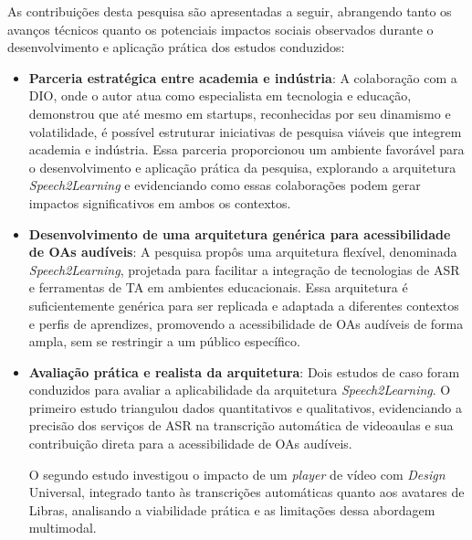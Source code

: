 
As contribuições desta pesquisa são apresentadas a seguir, abrangendo tanto os avanços técnicos quanto os potenciais impactos sociais observados durante o desenvolvimento e aplicação prática dos estudos conduzidos:

\begin{itemize} 

    \item \textbf{Parceria estratégica entre academia e indústria}: A colaboração com a DIO, onde o autor atua como especialista em tecnologia e educação, demonstrou que até mesmo em startups, reconhecidas por seu dinamismo e volatilidade, é possível estruturar iniciativas de pesquisa viáveis que integrem academia e indústria. Essa parceria proporcionou um ambiente favorável para o desenvolvimento e aplicação prática da pesquisa, explorando a arquitetura \textit{Speech2Learning} e evidenciando como essas colaborações podem gerar impactos significativos em ambos os contextos.

    \item \textbf{Desenvolvimento de uma arquitetura genérica para acessibilidade de OAs audíveis}: A pesquisa propôs uma arquitetura flexível, denominada \textit{Speech2Learning}, projetada para facilitar a integração de tecnologias de ASR e ferramentas de TA em ambientes educacionais. Essa arquitetura é suficientemente genérica para ser replicada e adaptada a diferentes contextos e perfis de aprendizes, promovendo a acessibilidade de OAs audíveis de forma ampla, sem se restringir a um público específico.

    \item \textbf{Avaliação prática e realista da arquitetura}: Dois estudos de caso foram conduzidos para avaliar a aplicabilidade da arquitetura \textit{Speech2Learning}. O primeiro estudo triangulou dados quantitativos e qualitativos, evidenciando a precisão dos serviços de ASR na transcrição automática de videoaulas e sua contribuição direta para a acessibilidade de OAs audíveis. 
    
    O segundo estudo investigou o impacto de um \textit{player} de vídeo com \textit{Design} Universal, integrado tanto às transcrições automáticas quanto aos avatares de Libras, analisando a viabilidade prática e as limitações dessa abordagem multimodal.


\end{itemize}
